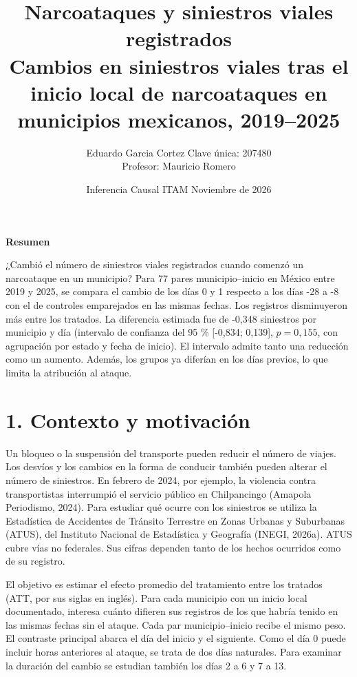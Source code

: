 \documentclass[11pt,letterpaper]{article}
\title{\textbf{Narcoataques y siniestros viales registrados}\\[0.2em]\large Cambios en siniestros viales tras el inicio local de narcoataques en municipios mexicanos, 2019--2025}
\author{\normalsize Eduardo Garcia Cortez \quad Clave única: 207480\\\normalsize Profesor: Mauricio Romero}
\date{\normalsize Inferencia Causal \textperiodcentered{} ITAM \textperiodcentered{} Noviembre de 2026}
\renewenvironment{abstract}{\par\begin{center}\small\bfseries Resumen\end{center}\small\RaggedRight\noindent}{\par}
\begin{document}
\RaggedRight\setlength{\parindent}{0pt}\maketitle

\begin{abstract}

¿Cambió el número de siniestros viales registrados cuando comenzó un narcoataque en un municipio? Para 77 pares municipio--inicio en México entre 2019 y 2025, se compara el cambio de los días 0 y 1 respecto a los días -28 a -8 con el de controles emparejados en las mismas fechas. Los registros disminuyeron más entre los tratados. La diferencia estimada fue de -0,348 siniestros por municipio y día (intervalo de confianza del 95 \% [-0,834; 0,139], $p=0{,}155$, con agrupación por estado y fecha de inicio). El intervalo admite tanto una reducción como un aumento. Además, los grupos ya diferían en los días previos, lo que limita la atribución al ataque.\par

\end{abstract}

\section*{1. Contexto y motivación}

Un bloqueo o la suspensión del transporte pueden reducir el número de viajes. Los desvíos y los cambios en la forma de conducir también pueden alterar el número de siniestros. En febrero de 2024, por ejemplo, la violencia contra transportistas interrumpió el servicio público en Chilpancingo (Amapola Periodismo, 2024). Para estudiar qué ocurre con los siniestros se utiliza la Estadística de Accidentes de Tránsito Terrestre en Zonas Urbanas y Suburbanas (ATUS), del Instituto Nacional de Estadística y Geografía (INEGI, 2026a). ATUS cubre vías no federales. Sus cifras dependen tanto de los hechos ocurridos como de su registro.\par

El objetivo es estimar el efecto promedio del tratamiento entre los tratados (ATT, por sus siglas en inglés). Para cada municipio con un inicio local documentado, interesa cuánto difieren sus registros de los que habría tenido en las mismas fechas sin el ataque. Cada par municipio--inicio recibe el mismo peso. El contraste principal abarca el día del inicio y el siguiente. Como el día 0 puede incluir horas anteriores al ataque, se trata de dos días naturales. Para examinar la duración del cambio se estudian también los días 2 a 6 y 7 a 13.\par
\end{document}
